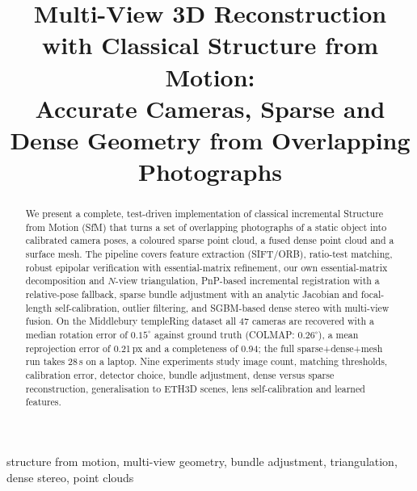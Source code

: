 \documentclass[conference,11pt]{IEEEtran}
\begin{document}
\title{Multi-View 3D Reconstruction with Classical Structure from Motion: \\
Accurate Cameras, Sparse and Dense Geometry from Overlapping Photographs}



\maketitle

\begin{abstract}
We present a complete, test-driven implementation of classical incremental Structure from Motion (SfM) that turns a set of overlapping photographs of a static object into calibrated camera poses, a coloured sparse point cloud, a fused dense point cloud and a surface mesh. The pipeline covers feature extraction (SIFT/ORB), ratio-test matching, robust epipolar verification with essential-matrix refinement, our own essential-matrix decomposition and $N$-view triangulation, PnP-based incremental registration with a relative-pose fallback, sparse bundle adjustment with an analytic Jacobian and focal-length self-calibration, outlier filtering, and SGBM-based dense stereo with multi-view fusion. On the Middlebury templeRing dataset all 47 cameras are recovered with a median rotation error of $0.15^\circ$ against ground truth (COLMAP: $0.26^\circ$), a mean reprojection error of 0.21\,px and a completeness of 0.94; the full sparse+dense+mesh run takes 28\,s on a laptop. Nine experiments study image count, matching thresholds, calibration error, detector choice, bundle adjustment, dense versus sparse reconstruction, generalisation to ETH3D scenes, lens self-calibration and learned features.
\end{abstract}

\begin{IEEEkeywords}
structure from motion, multi-view geometry, bundle adjustment, triangulation, dense stereo, point clouds
\end{IEEEkeywords}

\noindent\setlength{\fboxsep}{4pt}
\vspace{1mm}
\end{document}
